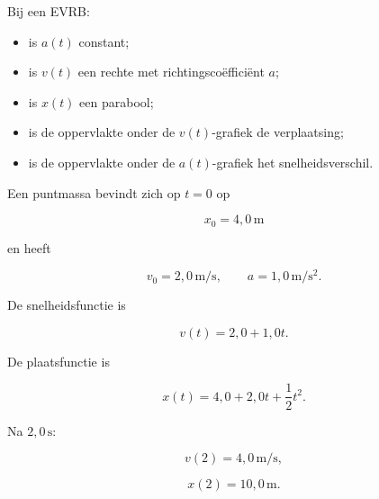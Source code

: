 \documentclass{ximera}
\begin{document}
\begin{eigenschap}

Bij een EVRB:

\begin{itemize}

 \item is $a(t)$ constant;

 \item is $v(t)$ een rechte met richtingscoëfficiënt $a$;

 \item is $x(t)$ een parabool;

 \item is de oppervlakte onder de $v(t)$-grafiek de verplaatsing;

 \item is de oppervlakte onder de $a(t)$-grafiek het snelheidsverschil.

\end{itemize}

\end{eigenschap}

\begin{voorbeeld}

Een puntmassa bevindt zich op $t=0$ op

\[x_0=4,0\,\mathrm{m}\]

en heeft

\[v_0=2,0\,\mathrm{m/s}, \qquad a=1,0\,\mathrm{m/s^2}.\]

De snelheidsfunctie is

\[v(t)=2,0+1,0t.\]

De plaatsfunctie is

\[x(t)=4,0+2,0t+\frac12t^2.\]

Na $2,0\,\mathrm{s}$:

\[v(2)=4,0\,\mathrm{m/s},\]

\[x(2)=10,0\,\mathrm{m}.\]

\end{voorbeeld}
\end{document}
